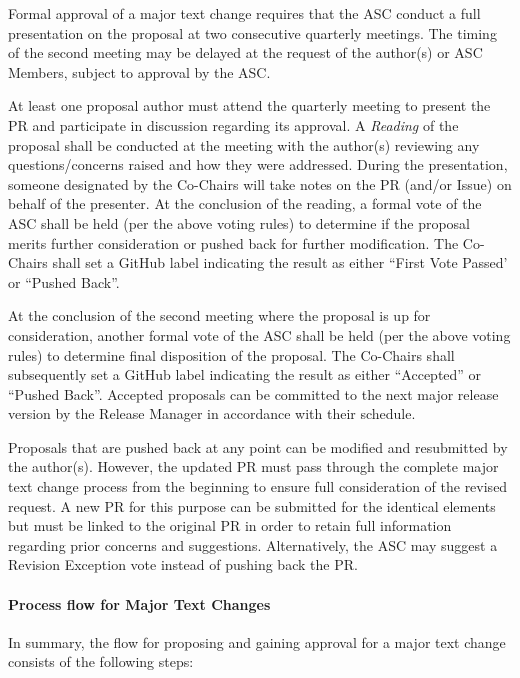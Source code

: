\documentclass{article}
\begin{document}
Formal approval of a major text change requires that the ASC conduct a full
presentation on the proposal at two consecutive quarterly meetings. The
timing of the second meeting may be delayed at the request of the
author(s) or ASC Members, subject to approval by the ASC.

At least one proposal author must attend the quarterly meeting to
present the PR and participate in discussion regarding its approval. A
\textit{Reading} of the proposal shall be conducted at the meeting with the
author(s) reviewing any questions/concerns raised and how they were
addressed. During the presentation, someone designated by the Co-Chairs
will take notes on the PR (and/or Issue) on behalf of the presenter.
At the conclusion of the reading, a formal vote of the ASC shall be held
(per the above voting rules) to determine if the proposal merits further
consideration or pushed back for further modification.
The Co-Chairs shall set a GitHub label indicating the
result as either ``First Vote Passed' or ``Pushed Back''.

At the conclusion of the second meeting where the proposal is up for
consideration, another formal vote of the ASC shall be held (per the
above voting rules) to determine final disposition of the proposal. The
Co-Chairs shall subsequently set a GitHub label indicating the result as
either ``Accepted'' or ``Pushed Back''. Accepted
proposals can be committed to the next major release version by the
Release Manager in accordance with their schedule.

Proposals that are pushed back at any point can be modified and
resubmitted by the author(s). However, the updated PR must pass through
the complete major text change process from the beginning to ensure full
consideration of the revised request. A new PR for this purpose can be
submitted for the identical elements but must be linked to the original
PR in order to retain full information regarding prior concerns and
suggestions. Alternatively, the ASC may suggest a Revision Exception vote
instead of pushing back the PR.

\hypertarget{process-flow-for-major-text-changes}{%
\paragraph{Process flow for Major Text Changes}%
\label{process-flow-for-major-text-changes}}

In summary, the flow for proposing and gaining approval for a major text
change consists of the following steps:
\end{document}
